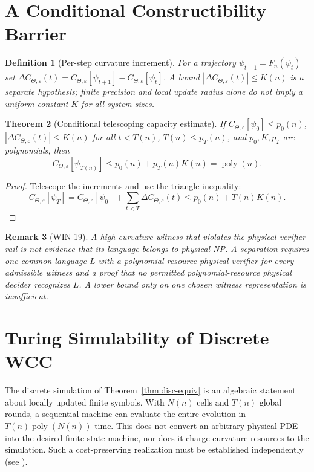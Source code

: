 \documentclass[11pt,a4paper]{article}
\newtheorem{theorem}{Theorem}[section]
\newtheorem{definition}[theorem]{Definition}
\newtheorem{remark}[theorem]{Remark}
\newcommand{\CTheta}{C_{\Theta,\varepsilon}}
\newcommand{\poly}{\operatorname{poly}}
\begin{document}
\section{A Conditional Constructibility Barrier}
\label{sec:constructibility}
\begin{definition}[Per-step curvature increment]
For a trajectory $\psi_{t+1}=F_n(\psi_t)$ set
$\Delta\CTheta(t)=\CTheta[\psi_{t+1}]-\CTheta[\psi_t]$.
A bound $|\Delta\CTheta(t)|\le K(n)$ is a \emph{separate hypothesis};
finite precision and local update radius alone do not imply a uniform
constant $K$ for all system sizes.
\end{definition}

\begin{theorem}[Conditional telescoping capacity estimate]
\label{thm:constructibility}
If $\CTheta[\psi_0]\le p_0(n)$,
$|\Delta\CTheta(t)|\le K(n)$ for all $t<T(n)$,
$T(n)\le p_T(n)$, and $p_0,K,p_T$ are polynomials, then
\[
\CTheta[\psi_{T(n)}]\le p_0(n)+p_T(n)K(n)=\poly(n).
\]
\end{theorem}
\begin{proof}
Telescope the increments and use the triangle inequality:
\[
\CTheta[\psi_T]=\CTheta[\psi_0]+\sum_{t<T}\Delta\CTheta(t)
\le p_0(n)+T(n)K(n).
\]
\end{proof}
\begin{remark}[WIN-19]
A high-curvature \emph{witness} that violates the physical verifier rail
is not evidence that its language belongs to physical NP. A separation
requires one common language $L$ with a polynomial-resource physical
verifier for every admissible witness and a proof that no permitted
polynomial-resource physical decider recognizes $L$. A lower bound only
on one chosen witness representation is insufficient.
\end{remark}

\section{Turing Simulability of Discrete WCC}
The discrete simulation of Theorem~\ref{thm:disc-equiv} is an algebraic
statement about locally updated finite symbols. With $N(n)$ cells and
$T(n)$ global rounds, a sequential machine can evaluate the entire
evolution in $T(n)\poly(N(n))$ time. This does not convert an arbitrary
physical PDE into the desired finite-state machine, nor does it charge
curvature resources to the simulation. Such a cost-preserving realization
must be established independently (see \cite{Reyes2025_DiscreteWCC}).
\end{document}
